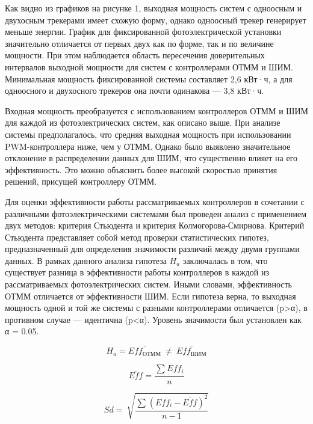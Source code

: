 \begin{multicols}{2}
Как видно из графиков на рисунке 1, выходная мощность систем с одноосным
и двухосным трекерами имеет схожую форму, однако одноосный трекер
генерирует меньше энергии. График для фиксированной фотоэлектрической
установки значительно отличается от первых двух как по форме, так и по
величине мощности. При этом наблюдается область пересечения
доверительных интервалов выходной мощности для систем с контроллерами
ОТММ и ШИМ. Минимальная мощность фиксированной системы составляет 2,6
кВт·ч, а для одноосного и двухосного трекеров она почти одинакова ---
3,8 кВт·ч.

Входная мощность преобразуется с использованием контроллеров ОТММ и ШИМ
для каждой из фотоэлектрических систем, как описано выше. При анализе
системы предполагалось, что средняя выходная мощность при использовании
PWM-контроллера ниже, чем у ОТММ. Однако было выявлено значительное
отклонение в распределении данных для ШИМ, что существенно влияет на его
эффективность. Это можно объяснить более высокой скоростью принятия
решений, присущей контроллеру ОТММ.

Для оценки эффективности работы рассматриваемых контроллеров в сочетании
с различными фотоэлектрическими системами был проведен анализ с
применением двух методов: критерия Стьюдента и критерия
Колмогорова-Смирнова. Критерий Стьюдента представляет собой метод
проверки статистических гипотез, предназначенный для определения
значимости различий между двумя группами данных. В рамках данного
анализа гипотеза \(H_{a}\) заключалась в том, что существует разница в
эффективности работы контроллеров в каждой из рассматриваемых
фотоэлектрических систем. Иными словами, эффективность ОТММ отличается
от эффективности ШИМ. Если гипотеза верна, то выходная мощность одной и
той же системы с разными контроллерами отличается (p\textgreater α), в
противном случае --- идентична (p\textless α). Уровень значимости был
установлен как α = 0.05.

\begin{equation}
H_{a} = \overline{{Eff}_{\text{ОТММ}}}\  \neq \ \overline{{Eff}_{\text{ШИМ}}}
\end{equation}

\begin{equation}
\overline{Eff} = \frac{\sum_{}^{}{Eff}_{i}}{n}
\end{equation}

\begin{equation}
Sd = \ \sqrt{\frac{\sum_{}^{}{({Eff}_{i} - \overline{Eff})}^{2}}{n - 1}}
\end{equation}


\end{multicols}
